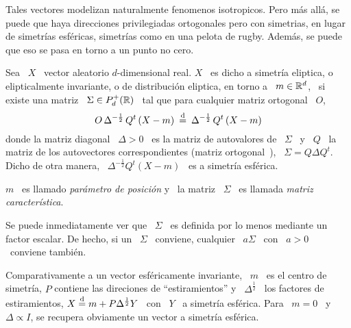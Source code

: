 Tales vectores modelizan naturalmente  fenomenos isotropicos. Pero m\'as all\'a,
se puede que haya direcciones  privilegiadas ortogonales pero con simetrias, \ie
en  lugar  de   simetr\'ias  esf\'ericas,  simetr\'ias  como  en   una  pelota  de
rugby. Adem\'as, se puede que eso se pasa en torno a un punto no cero.
%
\begin{definicion}
  Sea  \  $X$  \ vector  aleatorio  $d$-dimensional  real.   $X$  \ es  dicho  a
  simetr\'ia  eliptica,   o  elipticalmente  invariante,   o  de  distribuci\'on
  eliptica, en torno a \ $m \in  \mathbb{R}^d$, \ si existe una matriz \ $\Sigma \in
  P_d^+(\mathbb{R})$ \ tal que para cualquier matriz ortogonal \ $O$,
  \[
  O  \,   \Delta^{-\frac12}  \,  Q^t  \left(   X  -  m  \right)   \:  \stackrel{\mathrm{d}}{=}  \:
  \Delta^{-\frac12} \, Q^t \left( X - m \right)
  \]
  donde la  matriz diagonal \ $\Delta > 0$ \ es  la matriz de  autovalores de \
  $\Sigma$ \  y \ $Q$ \  la matriz de los  autovectores correspondientes (matriz
  ortogonal~\cite{Bha97, Bha07, HorJoh13}), \ $\Sigma  = Q \Delta Q^t$. Dicho de
  otra manera, \ $\Delta^{-\frac12} Q^t \left(  X - m \right)$ \ es a simetr\'ia
  esf\'erica.

  $m$ \ es llamado {\em par\'ametro de posici\'on} y \ la matriz \ $\Sigma$ \ es
  llamada {\em matriz caracter\'istica}.
\end{definicion}
%
Se puede inmediatamente  ver que \ $\Sigma$ \ es definida  por lo menos mediante
un factor escalar. De hecho, si un \ $\Sigma$ \ conviene, cualquier \ $a \Sigma$
\ con \ $a > 0$ \ conviene tambi\'en.

Comparativamente a un  vector esf\'ericamente invariante, \ $m$ \  es el centro de
simetr\'ia,   $P$   contiene   las   direciones   de   ``estiramientos''   y   \
$\Delta^{\frac12}$  \   los  factores  de   estiramientos,  $X  \stackrel{\mathrm{d}}{=}  m   +  P
\Delta^{\frac12} Y$ \  con \ $Y$ \ a simetr\'ia  esf\'erica. Para \ $m =  0$ \ y \
$\Delta \propto I$, se recupera obviamente un vector a simetr\'ia esf\'erica.

